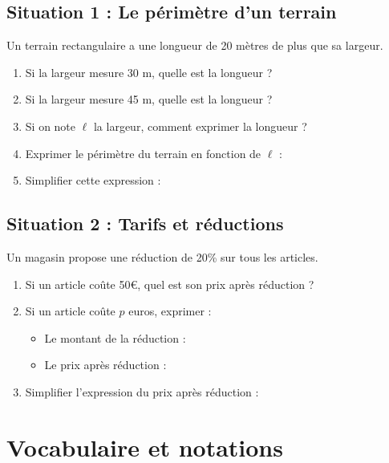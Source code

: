 \subsection*{Situation 1 : Le périmètre d'un terrain}

\begin{activitybox}
	Un terrain rectangulaire a une longueur de 20 mètres de plus que sa largeur.
	
	\begin{enumerate}
		\item Si la largeur mesure 30 m, quelle est la longueur ? \trous{3cm}
		\item Si la largeur mesure 45 m, quelle est la longueur ? \trous{3cm}
		\item Si on note $\ell$ la largeur, comment exprimer la longueur ? \trous{5cm}
		\item Exprimer le périmètre du terrain en fonction de $\ell$ : \trous{8cm}
		\item Simplifier cette expression : \trous{8cm}
	\end{enumerate}
\end{activitybox}

\subsection*{Situation 2 : Tarifs et réductions}

\begin{activitybox}
	Un magasin propose une réduction de 20\% sur tous les articles.
	
	\begin{enumerate}
		\item Si un article coûte 50€, quel est son prix après réduction ? \trous{3cm}
		\item Si un article coûte $p$ euros, exprimer :
		\begin{itemize}
			\item Le montant de la réduction : \trous{5cm}
			\item Le prix après réduction : \trous{5cm}
		\end{itemize}
		\item Simplifier l'expression du prix après réduction : \trous{5cm}
	\end{enumerate}
\end{activitybox}

\section{Vocabulaire et notations}

